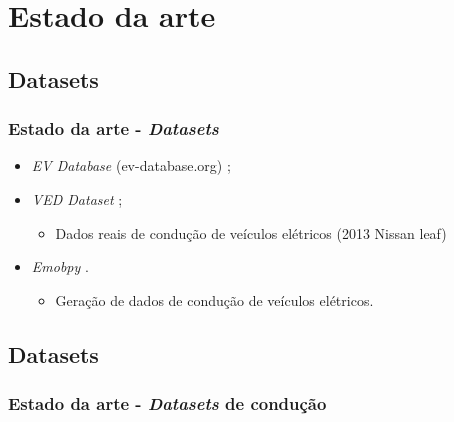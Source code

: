 \documentclass{beamer}
\begin{document}
\section[Estado da arte]{Estado da arte}
\subsection[Datasets]{Datasets}
\begin{frame}
\frametitle{Estado da arte - \textit{Datasets}}

\begin{itemize}
	\item \textit{EV Database} (ev-database.org) ;
	\item \textit{VED Dataset} ;
		  \begin{itemize}
			  \item Dados reais de condução de veículos elétricos (2013 Nissan leaf)  
		  \end{itemize}
	\item \textit{Emobpy} .
		  \begin{itemize}
			  \item Geração de dados de condução de veículos elétricos.
		  \end{itemize}
\end{itemize}

\end{frame}

\subsection[\textit{Datasets} de condução]{Datasets}
\begin{frame}
\frametitle{Estado da arte - \textit{Datasets} de condução}


\end{frame}
\end{document}
